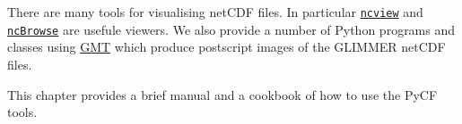 There are many tools for visualising netCDF files. In particular \href{http://meteora.ucsd.edu/~pierce/ncview\_home\_page.html}{\texttt{ncview}} and \href{http://www.epic.noaa.gov/java/ncBrowse/}{\texttt{ncBrowse}} are usefule viewers. We also provide a number of Python programs and classes using \href{http://gmt.soest.hawaii.edu/}{GMT} which produce postscript images of the GLIMMER netCDF files.

This chapter provides a brief manual and a cookbook of how to use the PyCF tools. 



